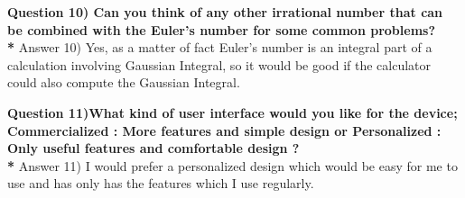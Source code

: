 \documentclass{article}
\begin{document}
\noindent \textbf {Question 10) Can you think of any other irrational number that can be combined with the Euler's number for some common problems?\\*}
\noindent Answer 10) Yes, as a matter of fact Euler's number is an integral part of a calculation involving Gaussian Integral, so it would be good if the calculator could also compute the Gaussian Integral.
\begin{flushleft}
\hrulefill
\end{flushleft}

\noindent \textbf{Question 11)What kind of user interface would you like for the device;
Commercialized : More features and simple design or Personalized : Only useful features and comfortable design ?\\*}
\noindent Answer 11) I would prefer a personalized design which would be easy for me to use and has only has the features which I use regularly.
\begin{flushleft}
\hrulefill
\end{flushleft}



 
\end{document}
